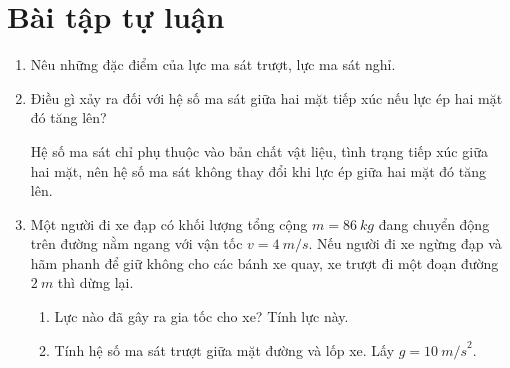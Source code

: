 \section{Bài tập tự luận}
\begin{enumerate}[label=\bfseries Bài \arabic*:]
		\item {}
	
	{
		Nêu những đặc điểm của lực ma sát trượt, lực ma sát nghỉ.
	}
	

	
	\item {}
	
	
	{Điều gì xảy ra đối với hệ số ma sát giữa hai mặt tiếp xúc nếu lực ép hai mặt đó tăng lên?
	}
	
	\hideall
	{Hệ số ma sát chỉ phụ thuộc vào bản chất vật liệu, tình trạng tiếp xúc giữa hai mặt, nên hệ số ma sát không thay đổi khi lực ép giữa hai mặt đó tăng lên.
	}
	\item {}
	
	{
		Một người đi xe đạp có khối lượng tổng cộng $m = \SI{86}{kg}$ đang chuyển động trên đường nằm ngang với vận tốc $v = \SI{4}{m/s}$. Nếu người đi xe ngừng đạp và hãm phanh để giữ không cho các bánh xe quay, xe trượt đi một đoạn đường $\SI{2}{m}$ thì dừng lại.
		\begin{enumerate}[label=\alph*)]
			\item Lực nào đã gây ra gia tốc cho xe? Tính lực này.
			\item Tính hệ số ma sát trượt giữa mặt đường và lốp xe. Lấy $g = \SI{10}{m/s}^2$.
		\end{enumerate}
	}
	

\end{enumerate}
